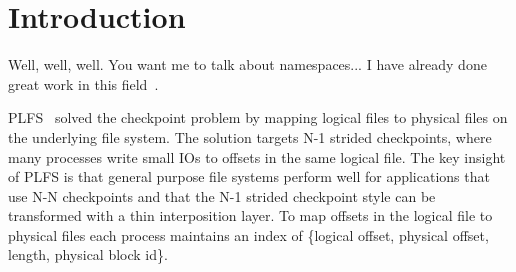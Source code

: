 \section{Introduction}
\label{sec:introduction}
Well, well, well. You want me to talk about namespaces... I have already done
great work in this field~\cite{sevilla:sc15-mantle, sevilla:sc15-malacology}.

PLFS~\cite{bent_plfs_2009} solved the checkpoint problem by mapping logical
files to physical files on the underlying file system. The solution targets N-1
strided checkpoints, where many processes write small IOs to offsets in the
same logical file. The key insight of PLFS is that general purpose file systems
perform well for applications that use N-N checkpoints and that the N-1 strided
checkpoint style can be transformed with a thin interposition layer. To map
offsets in the logical file to physical files each process maintains an index
of \{logical offset, physical offset, length, physical block id\}. 


